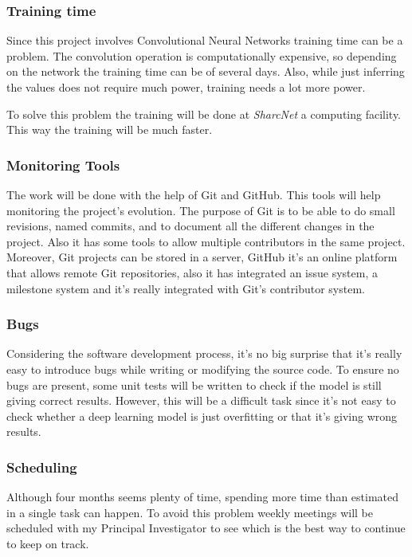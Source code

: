 \subsubsection{Training time}

Since this project involves Convolutional Neural Networks training time can be a problem. 
The convolution operation is computationally expensive, so depending on the network the 
training time can be of several days. Also, while just inferring the values does not require
much power, training needs a lot more power. 

To solve this problem the training will be done at \emph{SharcNet} a computing facility. 
This way the training will be much faster.

\subsubsection{Monitoring Tools}

The work will be done with the help of Git and GitHub. This tools will help monitoring
the project's evolution. The purpose of Git is to be able to do small revisions,
named commits, and to document all the different changes in the project. Also it has
some tools to allow multiple contributors in the same project. Moreover,
Git projects can be stored in a server, GitHub it's an online platform that allows
remote Git repositories, also it has integrated an issue system, a milestone system
and it's really integrated with Git's contributor system.
~\cites{tool:git}{tool:github}

\subsubsection{Bugs}

Considering the software development process, it's no big surprise that it's really easy to
introduce bugs while writing or modifying the source code. To ensure no bugs are present,
some unit tests will be written to check if the model is still giving correct results.
However, this will be a difficult task since it's not easy to check whether a deep 
learning model is just overfitting or that it's giving wrong results.

\subsubsection{Scheduling}

Although four months seems plenty of time, spending more time than estimated in a single task
can happen. To avoid this problem weekly meetings will be scheduled with my Principal Investigator
to see which is the best way to continue to keep on track.

